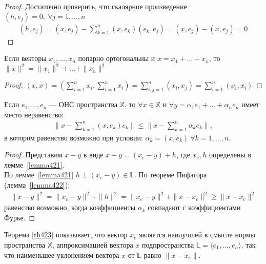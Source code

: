 \begin{proof}
  Достаточно проверить, что скалярное произведение \\ $(h, e_j) = 0, \ \forall j =
  1, \dots, n$
  \begin{gather*}
    (h, e_j) = (x, e_j) - \sum\limits_{k = 1}^{n} (x, e_k) (e_k, e_j) =
    (x, e_j) - (x, e_j) = 0
  \end{gather*}
\end{proof}

\begin{lemma}
  \label{lemma422}
  Если векторы $x_1, \dots, x_n$ попарно ортогональны и $x = x_1 + \dots +
  x_n$, то $\|x\|^2 = \|x_1\|^2 + \dots + \|x_n\|^2$
\end{lemma}

\begin{proof}
  $(x, x) = (\sum\limits_{i = 1}^{n} x_i, \sum\limits_{i = 1}^{n} x_i) =
  \sum\limits_{i, j = 1}^{n} (x_i, x_j) = \sum\limits_{i = 1}^{n} (x_i, x_i)$
\end{proof}

\begin{theorem}
  \label{th423}
  Если $e_1, \dots, e_n$ --- ОНС пространства $\mathbb{X}$, то $\forall x \in
  \mathbb{X}$ и $\forall y = \alpha_1 e_1 + \dots + \alpha_n e_n$ имеет место
  неравенство:
  \begin{gather*}
    \|x - \sum\limits_{k = 1}^{n} (x, e_k) e_k \| \leq \|x - \sum\limits_{k =
    1}^{n} \alpha_k e_k \|,
  \end{gather*}
  в котором равенство возможно при условии: $\alpha_k = (x, e_k) \ \forall k = 1,
  \dots, n$.
\end{theorem}

\begin{proof}
  Представим $x - y$ в виде $x - y = (x_e - y) + h$, где $x_e, h$ определены в
  лемме~\eqref{lemma421}. \\
  По лемме~\eqref{lemma421} $h \perp (x_e - y) \in \mathbb{L}$. По теореме
  Пифагора (лемма~\ref{lemma422}):
  \begin{gather*}
    \|x - y\|^2 = \|x_e - y\|^2 + \|h\|^2 = \|x_e - y\|^2 + \|x - x_e\|^2 \geq
    \|x - x_e\|^2
  \end{gather*}
  равенство возможно, когда коэффициенты $\alpha_k$ совпадают с коэффициентами
  Фурье.
\end{proof}

\begin{remark}
  Теорема \eqref{th423} показывает, что вектор $x_e$ является наилучшей в
  смысле нормы пространства $\mathbb{X}$, аппроксимацией вектора $x$
  подпространства $\mathbb{L} = \langle e_1, \dots, e_n \rangle$, так что
  наименьшее уклонением вектора $x$ от $\mathbb{L}$ равно $\|x - x_e\|$.
\end{remark}

